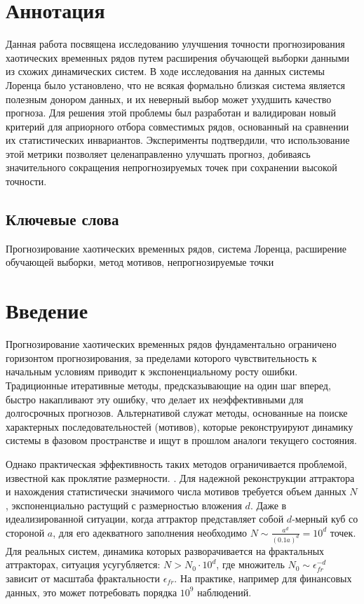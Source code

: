 \documentclass[a4paper,12pt]{extarticle}
\begin{document}
\newpage
\section*{Аннотация}
Данная работа посвящена исследованию улучшения точности прогнозирования хаотических временных 
рядов путем расширения обучающей выборки данными из схожих динамических систем. В ходе исследования
 на данных системы Лоренца было установлено, что не всякая формально близкая система является
  полезным донором данных, и их неверный выбор может ухудшить качество прогноза. Для решения 
  этой проблемы был разработан и валидирован новый критерий для априорного отбора совместимых
   рядов, основанный на сравнении их статистических инвариантов. Эксперименты подтвердили, что
    использование этой метрики позволяет целенаправленно улучшать прогноз, добиваясь значительного
     сокращения непрогнозируемых точек при сохранении высокой точности.
  \subsection*{Ключевые слова}
Прогнозирование хаотических временных рядов, система Лоренца,
расширение обучающей выборки, метод мотивов, непрогнозируемые точки

\newpage
\tableofcontents
\newpage
\section{Введение}
Прогнозирование хаотических временных рядов фундаментально ограничено
 горизонтом прогнозирования, за пределами которого чувствительность
  к начальным условиям приводит к экспоненциальному росту ошибки. \cite{MalinetskiyPotapov2002, Gilmore1984}
  Традиционные итеративные методы, предсказывающие на один шаг вперед,
   быстро накапливают эту ошибку, что делает их неэффективными для долгосрочных
    прогнозов. Альтернативой служат методы, основанные на поиске характерных
    последовательностей (мотивов), которые реконструируют динамику системы в
    фазовом пространстве и ищут в прошлом аналоги текущего состояния.

Однако практическая эффективность таких методов ограничивается проблемой, известной как проклятие размерности.
. Для надежной реконструкции аттрактора и нахождения статистически
 значимого числа мотивов требуется объем данных $N$, экспоненциально растущий
  с размерностью вложения $d$. Даже в идеализированной ситуации, когда аттрактор
   представляет собой $d$-мерный куб со стороной $a$, для его адекватного заполнения
    необходимо $N \sim \frac{a^d}{(0.1a)^d} = 10^d$ точек. Для реальных систем,
    динамика которых разворачивается на фрактальных аттракторах, ситуация усугубляется:
     $N > N_0 \cdot 10^d$, где множитель $N_0 \sim \epsilon_{fr}^{-d}$ зависит
     от масштаба фрактальности $\epsilon_{fr}$. На практике, например для финансовых
      данных, это может потребовать порядка $10^9$ наблюдений.
\end{document}
